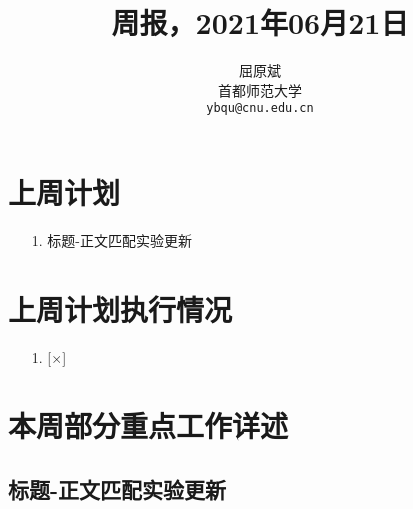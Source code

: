 \documentclass[11pt]{article}
\title{周报，2021年06月21日}
\author{屈原斌 \\
  首都师范大学 \\
    {\tt ybqu@cnu.edu.cn}}
\date{}
\begin{document}
\begin{CJK}{UTF8}{gkai}

\maketitle
\CJKindent

\section{上周计划}


\begin{itemize}
  \item [1.] 标题-正文匹配实验更新
\end{itemize}


\section{上周计划执行情况}
\begin{itemize}
\item [1.] [$\times$] 
\end{itemize}

\section{本周部分重点工作详述}

\subsection{标题-正文匹配实验更新}


\end{CJK}
\end{document}
